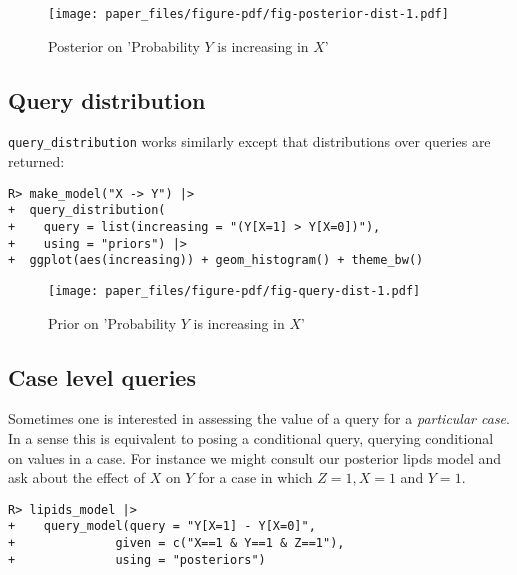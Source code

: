 \documentclass[
  11pt,
  article]{jss}
\begin{document}
\begin{figure}[t]

{\centering \texttt{[image: paper\_files/figure-pdf/fig-posterior-dist-1.pdf]}

}

\caption{\label{fig-posterior-dist}Posterior on 'Probability \(Y\) is
increasing in \(X\)'}

\end{figure}

\FloatBarrier

\hypertarget{query-distribution}{%
\subsection{Query distribution}\label{query-distribution}}

\texttt{query\_distribution} works similarly except that distributions
over queries are returned:

\begin{verbatim}
R> make_model("X -> Y") |> 
+  query_distribution(
+    query = list(increasing = "(Y[X=1] > Y[X=0])"), 
+    using = "priors") |>
+  ggplot(aes(increasing)) + geom_histogram() + theme_bw()
\end{verbatim}

\begin{figure}[t]

{\centering \texttt{[image: paper\_files/figure-pdf/fig-query-dist-1.pdf]}

}

\caption{\label{fig-query-dist}Prior on 'Probability \(Y\) is increasing
in \(X\)'}

\end{figure}

\hypertarget{case-level-queries}{%
\subsection{Case level queries}\label{case-level-queries}}

Sometimes one is interested in assessing the value of a query for a
\emph{particular case}. In a sense this is equivalent to posing a
conditional query, querying conditional on values in a case. For
instance we might consult our posterior lipds model and ask about the
effect of \(X\) on \(Y\) for a case in which \(Z=1, X=1\) and \(Y=1\).

\begin{verbatim}
R> lipids_model |>
+    query_model(query = "Y[X=1] - Y[X=0]",
+              given = c("X==1 & Y==1 & Z==1"),
+              using = "posteriors")
\end{verbatim}
\end{document}
